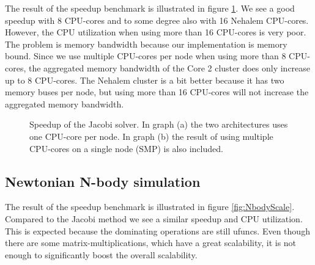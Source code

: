 \documentclass[10pt]{article}
\begin{document}
The result of the speedup benchmark is illustrated in figure \ref{fig:JacobiScale}. We see a good speedup with 8 CPU-cores and to some degree also with 16 Nehalem CPU-cores. However, the CPU utilization when using more than 16 CPU-cores is very poor. The problem is memory bandwidth because our implementation is memory bound. Since we use multiple CPU-cores per node when using more than 8 CPU-cores, the aggregated memory bandwidth of the Core 2 cluster does only increase up to 8 CPU-cores. The Nehalem cluster is a bit better because it has two memory buses per node, but using more than 16 CPU-cores will not increase the aggregated memory bandwidth.

\begin{figure}%
  \begin{center}%
    \caption{Speedup of the Jacobi solver. In graph (a) the two architectures uses one CPU-core per node. In graph (b) the result of using multiple CPU-cores on a single node (SMP) is also included.}%
    \label{fig:JacobiScale}%
  \end{center}
\end{figure}


\subsection{Newtonian N-body simulation}
The result of the speedup benchmark is illustrated in figure \ref{fig:NbodyScale}. Compared to the Jacobi method we see a similar speedup and CPU utilization. This is expected because the dominating operations are still ufuncs. Even though there are some matrix-multiplications, which have a great scalability, it is not enough to significantly boost the overall scalability.
\end{document}
